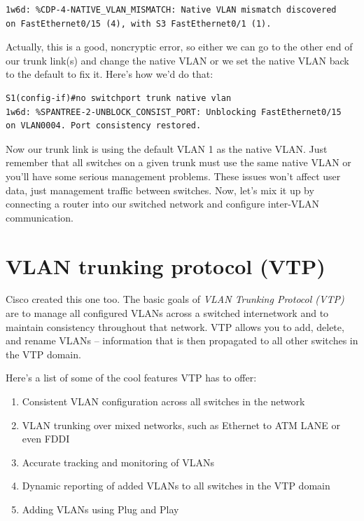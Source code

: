 \begin{verbatim}
1w6d: %CDP-4-NATIVE_VLAN_MISMATCH: Native VLAN mismatch discovered
on FastEthernet0/15 (4), with S3 FastEthernet0/1 (1).
\end{verbatim}

Actually, this is a good, noncryptic error, so either we can go to the
other end of our trunk link(s) and change the native VLAN or we set the
native VLAN back to the default to fix it. Here's how we'd do that:

\begin{verbatim}
S1(config-if)#no switchport trunk native vlan
1w6d: %SPANTREE-2-UNBLOCK_CONSIST_PORT: Unblocking FastEthernet0/15
on VLAN0004. Port consistency restored.
\end{verbatim}

Now our trunk link is using the default VLAN 1 as the native VLAN.
Just remember that all switches on a given trunk must use the same native VLAN or you'll have some serious management problems.
These issues won't affect user data, just management traffic between switches.
Now, let's mix it up by connecting a router into our switched network and configure inter-VLAN communication.




\section{VLAN trunking protocol (VTP)}

Cisco created this one too. The basic goals of \emph{VLAN Trunking
Protocol (VTP)} are to manage all configured VLANs across a switched
internetwork and to maintain consistency throughout that network. VTP
allows you to add, delete, and rename VLANs -- information that is then
propagated to all other switches in the VTP domain.

Here's a list of some of the cool features VTP has to offer:

\begin{enumerate}
\tightlist
\item
  Consistent VLAN configuration across all switches in the network
\item
  VLAN trunking over mixed networks, such as Ethernet to ATM LANE or
  even FDDI
\item
  Accurate tracking and monitoring of VLANs
\item
  Dynamic reporting of added VLANs to all switches in the VTP domain
\item
  Adding VLANs using Plug and Play
\end{enumerate}

